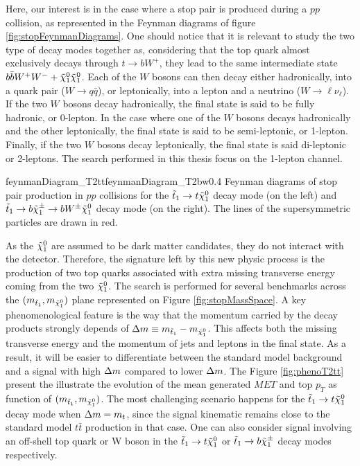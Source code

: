         Here, our interest is in the case where a stop pair is produced during a $pp$ collision, 
        as represented in the Feynman diagrams of figure \ref{fig:stopFeynmanDiagrams}. One should 
        notice that it is relevant to study the two type of decay modes together as, considering 
        that the top quark almost exclusively decays through $t \rightarrow b W^+$, they lead to 
        the same intermediate state $b \bar{b} W^+ W^- + \tilde{\chi}_1^0 \tilde{\chi}_1^0$. Each of the 
        $W$ bosons can then decay either hadronically, into a quark pair ($W \rightarrow q\bar{q}$), 
        or leptonically, into a lepton and a neutrino ($W \rightarrow \ell \nu_{\ell}$). If the two 
        $W$ bosons decay hadronically, the final state is said to be fully hadronic, or 0-lepton. 
        In the case where one of the $W$ bosons decays hadronically and the other leptonically, the 
        final state is said to be semi-leptonic, or 1-lepton. Finally, if the two $W$ bosons decay 
        leptonically, the final state is said di-leptonic or 2-leptons. The search performed in this 
        thesis focus on the 1-lepton channel. 

                         {feynmanDiagram_T2tt}{feynmanDiagram_T2bw}{0.4}
                         {Feynman diagrams of stop pair production in $pp$ collisions for the 
                         $\tilde{t}_1 \rightarrow t \tilde{\chi}_1^0$ decay mode (on the left) and 
                         $\tilde{t}_1 \rightarrow b \tilde{\chi}_1^\pm \rightarrow b W^{\pm} \tilde{\chi}_1^0$ decay mode 
                         (on the right). The lines of the supersymmetric particles are drawn in red.}
   
        As the $\tilde{\chi}_1^0$ are assumed to be dark matter candidates, they do not interact with the 
        detector. Therefore, the signature left by this new physic process is the production of two top 
        quarks associated with extra missing transverse energy coming from the two $\tilde{\chi}_1^0$. The 
        search is performed for several benchmarks across the $(m_{\tilde{t}_1},m_{\tilde{\chi}_1^0})$ plane 
        represented on Figure \ref{fig:stopMassSpace}. A key phenomenological feature is the way that the 
        momentum carried by the decay products strongly depends of $\Delta m \equiv m_{\tilde{t}_1} - m_{\tilde{\chi}_1^0}$.
        This affects both the missing transverse energy and the momentum of jets and leptons in the final
        state. As a result, it will be easier to differentiate between the standard model background and 
        a signal with high $\Delta m$ compared to lower $\Delta m$. The Figure \ref{fig:phenoT2tt} present
        the illustrate the evolution of the mean generated $MET$ and top $p_T$ as function of $(m_{\tilde{t}_1},
        m_{\tilde{\chi}_1^0})$. The most challenging scenario happens for the $\tilde{t}_1 \rightarrow t \tilde{\chi}_1^0$
        decay mode when $\Delta m = m_{t}$, since the signal kinematic remains close to the standard
        model $t\bar{t}$ production in that case. One can also consider signal involving an off-shell
        top quark or W boson in the $\tilde{t}_1 \rightarrow t \tilde{\chi}_1^0$ or $\tilde{t}_1 \rightarrow b \tilde{\chi}_1^\pm$
        decay modes respectively.

